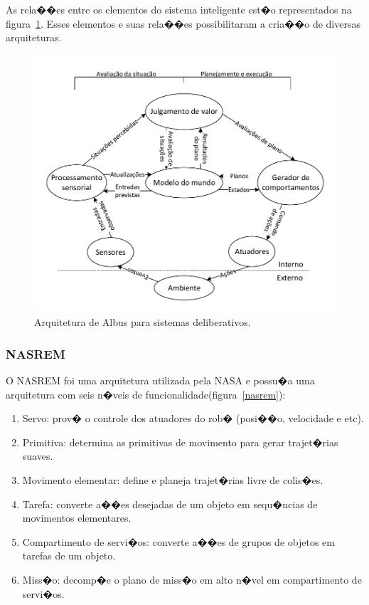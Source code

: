 As rela��es entre os elementos do sistema inteligente est�o representados na
figura~\ref{albus}.  Esses elementos e suas rela��es possibilitaram a cria��o de
diversas arquiteturas.

\begin{figure}[H]
\centering
\includegraphics[width=1\columnwidth]{figs/albus.pdf}
\caption{Arquitetura de Albus para sistemas deliberativos.}
\label{albus}
\end{figure}


\subsubsection{NASREM}
O NASREM \cite{albus1989nasa} foi uma arquitetura utilizada pela
NASA e possu�a uma arquitetura com seis n�veis de
funcionalidade(figura~\ref{nasrem}):

\begin{enumerate}
  \item Servo: prov� o controle dos atuadores do rob� (posi��o, velocidade e
  etc).
  \item Primitiva: determina as primitivas de movimento para gerar trajet�rias
  suaves.
  \item Movimento elementar: define e planeja trajet�rias livre de colis�es.
  \item Tarefa: converte a��es desejadas de um objeto em sequ�ncias de
  movimentos elementares.
  \item Compartimento de servi�os: converte a��es de grupos de objetos em
  tarefas de um objeto.
  \item Miss�o: decomp�e o plano de miss�o em alto n�vel em compartimento de
  servi�os.
\end{enumerate}

